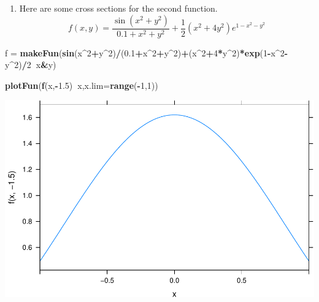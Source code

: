 \documentclass[
]{book}
\newenvironment{Shaded}{\begin{snugshade}}{\end{snugshade}}
\newcommand{\DataTypeTok}[1]{\textcolor[rgb]{0.13,0.29,0.53}{#1}}
\newcommand{\DecValTok}[1]{\textcolor[rgb]{0.00,0.00,0.81}{#1}}
\newcommand{\FloatTok}[1]{\textcolor[rgb]{0.00,0.00,0.81}{#1}}
\newcommand{\KeywordTok}[1]{\textcolor[rgb]{0.13,0.29,0.53}{\textbf{#1}}}
\newcommand{\NormalTok}[1]{#1}
\newcommand{\OperatorTok}[1]{\textcolor[rgb]{0.81,0.36,0.00}{\textbf{#1}}}
\newcommand{\StringTok}[1]{\textcolor[rgb]{0.31,0.60,0.02}{#1}}
\providecommand{\tightlist}{%
  \setlength{\itemsep}{0pt}\setlength{\parskip}{0pt}}
\begin{document}
\begin{enumerate}
\def\labelenumi{\arabic{enumi}.}
\setcounter{enumi}{1}
\tightlist
\item
  Here are some cross sections for the second function.
  \[
  f(x,y) = \frac{\sin(x^2+y^2)}{0.1+x^2+y^2}+ \frac{1}{2}(x^2+4y^2)e^{1-x^2-y^2}
  \]
\end{enumerate}

\begin{Shaded}
\begin{Highlighting}[]
\NormalTok{f =}\StringTok{ }\KeywordTok{makeFun}\NormalTok{(}\KeywordTok{sin}\NormalTok{(x}\OperatorTok{^}\DecValTok{2}\OperatorTok{+}\NormalTok{y}\OperatorTok{^}\DecValTok{2}\NormalTok{)}\OperatorTok{/}\NormalTok{(}\FloatTok{0.1}\OperatorTok{+}\NormalTok{x}\OperatorTok{^}\DecValTok{2}\OperatorTok{+}\NormalTok{y}\OperatorTok{^}\DecValTok{2}\NormalTok{)}\OperatorTok{+}\NormalTok{(x}\OperatorTok{^}\DecValTok{2}\OperatorTok{+}\DecValTok{4}\OperatorTok{*}\NormalTok{y}\OperatorTok{^}\DecValTok{2}\NormalTok{)}\OperatorTok{*}\KeywordTok{exp}\NormalTok{(}\DecValTok{1}\OperatorTok{-}\NormalTok{x}\OperatorTok{^}\DecValTok{2}\OperatorTok{-}\NormalTok{y}\OperatorTok{^}\DecValTok{2}\NormalTok{)}\OperatorTok{/}\DecValTok{2}\OperatorTok{~}\NormalTok{x}\OperatorTok{&}\NormalTok{y)}
\end{Highlighting}
\end{Shaded}

\begin{Shaded}
\begin{Highlighting}[]
\KeywordTok{plotFun}\NormalTok{(}\KeywordTok{f}\NormalTok{(x,}\OperatorTok{-}\FloatTok{1.5}\NormalTok{)}\OperatorTok{~}\NormalTok{x,}\DataTypeTok{x.lim=}\KeywordTok{range}\NormalTok{(}\OperatorTok{-}\DecValTok{1}\NormalTok{,}\DecValTok{1}\NormalTok{))}
\end{Highlighting}
\end{Shaded}

\includegraphics{_bookdown_files/math135_handbook_files/figure-latex/unnamed-chunk-79-1.pdf}
\end{document}
